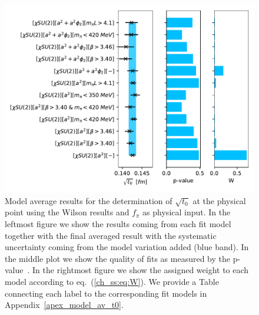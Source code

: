 \begin{figure}
    \centering
    \includegraphics[width=1.\textwidth]{./cap5/figs/BMA_SU2_w.pdf}
    \caption{Model average results for the determination of $\sqrt{t_0}$ at the physical point using the Wilson results and $f_{\pi}$ as physical input. In the leftmost figure we show the results coming from each fit model together with the final averaged result with the systematic uncertainty coming from the model variation added (blue band). In the middle plot we show the quality of fits as measured by the p-value~\citep{Bruno:2022mfy}. In the rightmost figure we show the assigned weight to each model according to eq.~(\ref{ch_ss:eq:W}). We provide a Table connecting each label to the corresponding fit models in Appendix~\ref{apex_model_av_t0}.}
    \label{ch_ss:fig:BMA_w_SU2}
\end{figure}


